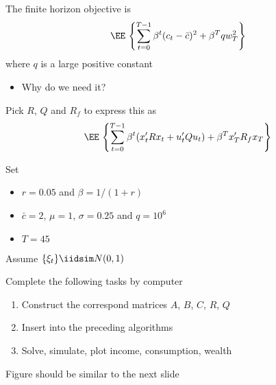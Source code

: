 \begin{frame}
    

    The finite horizon objective is
    \begin{equation*}
        \label{eq:lq_pio}
        \EE \,
        \left\{
            \sum_{t=0}^{T-1} \beta^t (c_t - \bar c)^2 + \beta^T q w_T^2
        \right\}
    \end{equation*}
    where $q$ is a large positive constant
    
    \begin{itemize}
        \item Why do we need it?
    \end{itemize}

    \Ex Pick $R$, $Q$ and $R_f$ to express this as
    \begin{equation*}
        \EE \,
        \left\{
            \sum_{t=0}^{T-1} \beta^t (x_t' R x_t + u_t' Q u_t) + \beta^T x_T' R_f x_T
        \right\}
    \end{equation*}

\end{frame}





\begin{frame}
    
    Set 
    \begin{itemize}
        \item $r = 0.05$ and $\beta = 1 / (1 + r)$
        \item $\bar c = 2$,  $\mu = 1$, $\sigma = 0.25$ and $q = 10^6$
        \item $T = 45$
    \end{itemize}
    
    
    Assume $\{\xi_t\} \iidsim N(0, 1)$

        \vspace{0.5em}
    \Ex Complete the following tasks by computer
    \begin{enumerate}
        \item Construct the correspond matrices $A$, $B$, $C$, $R$, $Q$
        \vspace{0.5em}
        \item Insert into the preceding algorithms
        \vspace{0.5em}
        \item Solve, simulate, plot income, consumption, wealth 
    \end{enumerate}

    Figure should be similar to the next slide

\end{frame}


